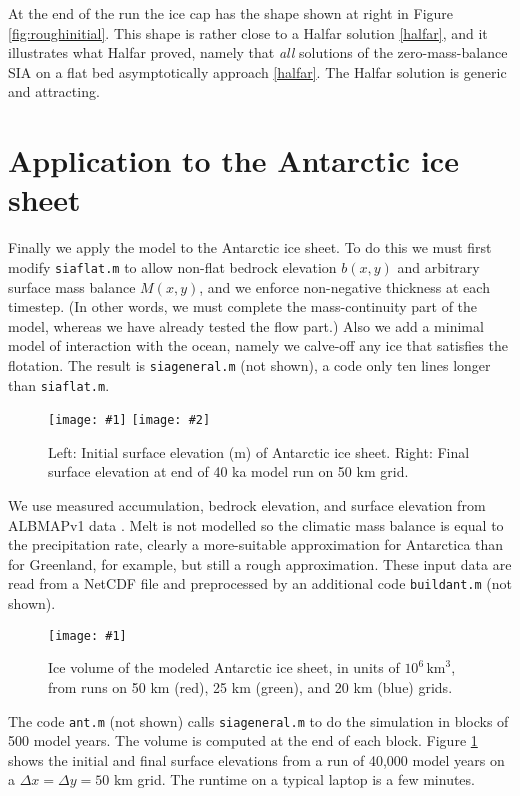 \documentclass[letterpaper,final,12pt,reqno]{amsart}
\newcommand{\onefigsize}[3]{
\begin{figure}[ht]
\centering
\texttt{[image: \#1]}
\caption{#2}
\label{fig:#1}
\end{figure}}
\newcommand{\onefig}[2]{\onefigsize{#1}{#2}{3.0in}}
\newcommand{\twofigsizes}[5]{
\begin{figure}[ht]
\centering
\texttt{[image: \#1]} \quad
\texttt{[image: \#2]}
\caption{#3}
\label{fig:#1}
\end{figure}}
\begin{document}
At the end of the run the ice cap has the shape shown at right in Figure \ref{fig:roughinitial}.  This shape is rather close to a Halfar solution \eqref{halfar}, and it illustrates what Halfar proved, namely that \emph{all} solutions of the zero-mass-balance SIA on a flat bed asymptotically approach \eqref{halfar}.  The Halfar solution is generic and attracting.


\section{Application to the Antarctic ice sheet}   \label{sec:antapp}

Finally we apply the model to the Antarctic ice sheet.  To do this we must first modify \texttt{siaflat.m} to allow non-flat bedrock elevation $b(x,y)$ and arbitrary surface mass balance $M(x,y)$, and we enforce non-negative thickness at each timestep.  (In other words, we must complete the mass-continuity part of the model, whereas we have already tested the flow part.)  Also we add a minimal model of interaction with the ocean, namely we calve-off any ice that satisfies the flotation.  The result is \texttt{siageneral.m} (not shown), a code only ten lines longer than \texttt{siaflat.m}.

\twofigsizes{antinitial}{antfinal}{Left: Initial surface elevation (m) of Antarctic ice sheet.  Right: Final surface elevation at end of 40 ka model run on 50 km grid.}{2.55in}{3.2in}

We use measured accumulation, bedrock elevation, and surface elevation from ALBMAPv1 data \cite{LeBrocqetal2010}.  Melt is not modelled so the climatic mass balance is equal to the precipitation rate, clearly a more-suitable approximation for Antarctica than for Greenland, for example, but still a rough approximation.  These input data are read from a NetCDF file and preprocessed by an additional code \texttt{buildant.m} (not shown).

\onefig{antvolcompare}{Ice volume of the modeled Antarctic ice sheet, in units of $10^6 \, \text{km}^3$, from runs on 50 km (red), 25 km (green), and 20 km (blue) grids.}

The code \texttt{ant.m} (not shown) calls \texttt{siageneral.m} to do the simulation in blocks of 500 model years.  The volume is computed at the end of each block.  Figure \ref{fig:antinitial} shows the initial and final surface elevations from a run of 40,000 model years on a $\Delta x = \Delta y = 50$ km grid.  The runtime on a typical laptop is a few minutes.
\end{document}
